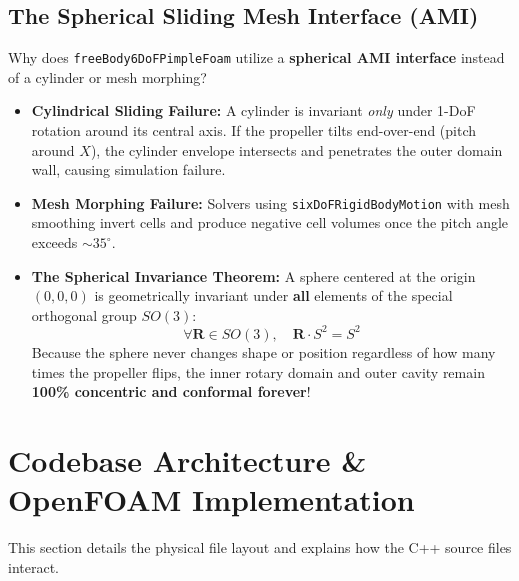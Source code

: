 \documentclass[11pt,a4paper]{article}
\newcommand{\tensor}[1]{\bm{#1}}
\begin{document}
\subsection{The Spherical Sliding Mesh Interface (AMI)}
Why does \texttt{freeBody6DoFPimpleFoam} utilize a \textbf{spherical AMI interface} instead of a cylinder or mesh morphing?
\begin{itemize}
    \item \textbf{Cylindrical Sliding Failure:} A cylinder is invariant \emph{only} under 1-DoF rotation around its central axis. If the propeller tilts end-over-end (pitch around $X$), the cylinder envelope intersects and penetrates the outer domain wall, causing simulation failure.
    \item \textbf{Mesh Morphing Failure:} Solvers using \texttt{sixDoFRigidBodyMotion} with mesh smoothing invert cells and produce negative cell volumes once the pitch angle exceeds $\sim 35^\circ$.
    \item \textbf{The Spherical Invariance Theorem:} A sphere centered at the origin $(0, 0, 0)$ is geometrically invariant under \textbf{all} elements of the special orthogonal group $SO(3)$:
    \begin{equation}
        \forall \tensor{R} \in SO(3), \quad \tensor{R} \cdot S^2 = S^2
    \end{equation}
    Because the sphere never changes shape or position regardless of how many times the propeller flips, the inner rotary domain and outer cavity remain \textbf{100\% concentric and conformal forever}!
\end{itemize}

\section{Codebase Architecture \& OpenFOAM Implementation}

This section details the physical file layout and explains how the C++ source files interact.
\end{document}
